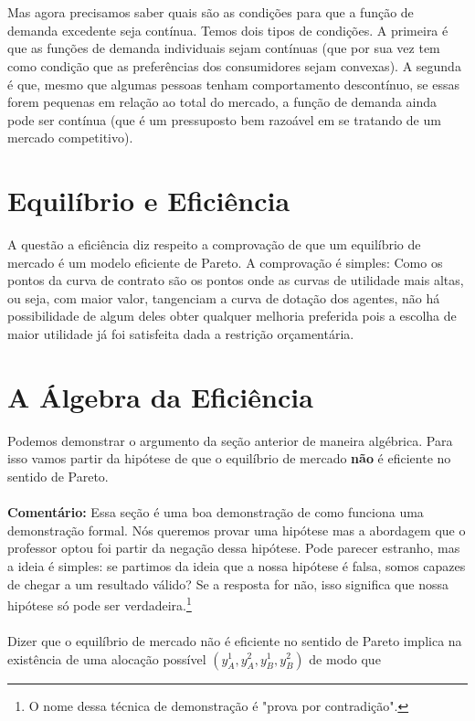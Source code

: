 \documentclass[a4paper,11pt,oneside]{book}
\theoremstyle{definition}
\theoremstyle{break}
\begin{document}
\\~\\
Mas agora precisamos saber quais são as condições para que a função de demanda excedente seja contínua. Temos dois tipos de condições. A primeira é que as funções de demanda individuais sejam contínuas (que por sua vez tem como condição que as preferências dos consumidores sejam convexas). A segunda é que, mesmo que algumas pessoas tenham comportamento descontínuo, se essas forem pequenas em relação ao total do mercado, a função de demanda ainda pode ser contínua (que é um pressuposto bem razoável em se tratando de um mercado competitivo).

\section{Equilíbrio e Eficiência}

A questão a eficiência diz respeito a comprovação de que um equilíbrio de mercado é um modelo eficiente de Pareto. A comprovação é simples: Como os pontos da curva de contrato são os pontos onde as curvas de utilidade mais altas, ou seja, com maior valor, tangenciam a curva de dotação dos agentes, não há possibilidade de algum deles obter qualquer melhoria preferida pois a escolha de maior utilidade já foi satisfeita dada a restrição orçamentária.

\section{A Álgebra da Eficiência}

Podemos demonstrar o argumento da seção anterior de maneira algébrica. Para isso vamos partir da hipótese de que o equilíbrio de mercado \textbf{não} é eficiente no sentido de Pareto.
\\~\\
\textbf{Comentário:} Essa seção é uma boa demonstração de como funciona uma demonstração formal. Nós queremos provar uma hipótese mas a abordagem que o professor optou foi partir da negação dessa hipótese. Pode parecer estranho, mas a ideia é simples: se partimos da ideia que a nossa hipótese é falsa, somos capazes de chegar a um resultado válido? Se a resposta for não, isso significa que nossa hipótese só pode ser verdadeira.\footnote{O nome dessa técnica de demonstração é "prova por contradição".}
\\~\\
Dizer que o equilíbrio de mercado não é eficiente no sentido de Pareto implica na existência de uma alocação possível $(y_A^1,y_A^2,y_B^1,y_B^2)$ de modo que
\end{document}
